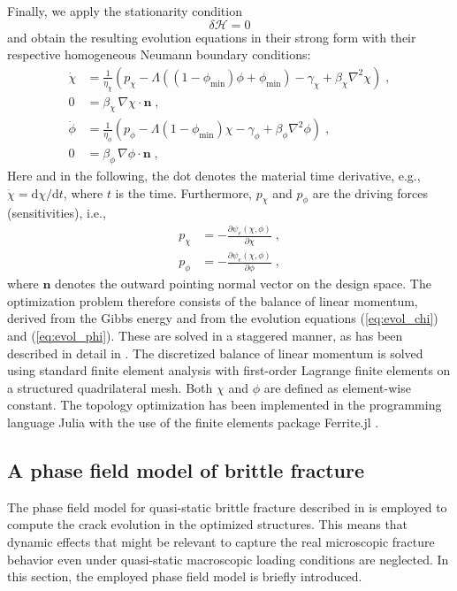 \documentclass[
	pdflatex,
	sn-mathphys-num
]{sn-jnl}
\theoremstyle{thmstyleone}%
\theoremstyle{thmstyletwo}%
\theoremstyle{thmstylethree}%
\begin{document}
Finally, we apply the stationarity condition
\begin{equation}
	\label{eq:var_H}
	\delta\mathcal{H}=0
\end{equation}
and obtain the resulting evolution equations in their strong
form with their respective homogeneous Neumann boundary conditions:
\begin{align}
	\label{eq:evol_chi}
	 \dot{\chi} &
	=\frac{1}{\eta_{\chi}}
	(p_\chi-\Lambda((1-\phi_\mathrm{min})\phi+\phi_\mathrm{min})
	-\gamma_\chi+\beta_\chi\nabla^2\chi)\;,
	\\
	0          & = \beta_\chi\,\nabla\chi\cdot\boldsymbol{n}\;,   \\
	\label{eq:evol_phi}
	 \dot{\phi} &
	=\frac{1}{\eta_{\phi}}
	(p_\phi-\Lambda(1-\phi_\mathrm{min})\chi-\gamma_\phi
	+\beta_{\phi}\nabla^2\phi)\;,
	\\
	0          & = \beta_{\phi}\,\nabla\phi\cdot\boldsymbol{n}\;,
\end{align}
Here and in the following, the dot denotes the material time
derivative, e.g., $\dot{\chi}=\mathrm{d}\chi/\mathrm{d}t$,
where $t$ is the time. Furthermore,
$p_\chi$ and $p_\phi$ are the driving forces
(sensitivities), i.e.,
\begin{align}
	p_\chi & =-\frac{\partial\psi_e(\chi,\phi)}
	{\partial\chi}\;, \\
	p_\phi & =-\frac{\partial\psi_e(\chi,\phi)}
	{\partial\phi}\;,
\end{align}
where $\boldsymbol{n}$ denotes the outward pointing normal vector
on the design space.
The optimization problem therefore consists of the balance of
linear momentum, derived from the Gibbs energy and from the
evolution equations (\ref{eq:evol_chi}) and (\ref{eq:evol_phi}).
These are solved in a staggered manner, as has been described in
detail in \cite{jantos_accurate_2019}. The discretized balance
of linear momentum is solved using standard finite element
analysis with first-order Lagrange finite elements on a
structured quadrilateral mesh. Both $\chi$ and $\phi$ are defined
as element-wise constant. The topology optimization has been
implemented in the programming language Julia \citep{Julia-2017}
with the use of the finite elements package Ferrite.jl
\citep{Carlsson_Ferrite_jl}.

\subsection{A phase field model of brittle
	fracture}\label{sec:phase_field}
The phase field model for quasi-static brittle fracture
described in \cite{kuhn_continuum_2010} is employed to compute
the crack evolution in the optimized structures.
This means that dynamic effects that might be relevant to
capture the real microscopic fracture behavior even under
quasi-static macroscopic loading conditions are neglected.
In this section, the employed phase field model is briefly
introduced.
\end{document}
